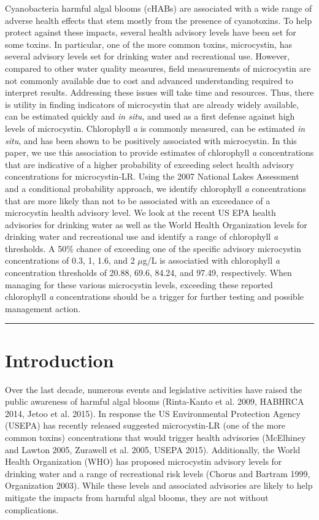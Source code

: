 \documentclass[11pt,]{article}
\begin{document}
Cyanobacteria harmful algal blooms (cHABs) are associated with a wide
range of adverse health effects that stem mostly from the presence of
cyanotoxins. To help protect against these impacts, several health
advisory levels have been set for some toxins. In particular, one of the
more common toxins, microcystin, has several advisory levels set for
drinking water and recreational use. However, compared to other water
quality measures, field measurements of microcystin are not commonly
available due to cost and advanced understanding required to interpret
results. Addressing these issues will take time and resources. Thus,
there is utility in finding indicators of microcystin that are already
widely available, can be estimated quickly and \emph{in situ}, and used
as a first defense against high levels of microcystin. Chlorophyll
\emph{a} is commonly measured, can be estimated \emph{in situ}, and has
been shown to be positively associated with microcystin. In this paper,
we use this association to provide estimates of chlorophyll \emph{a}
concentrations that are indicative of a higher probability of exceeding
select health advisory concentrations for microcystin-LR. Using the 2007
National Lakes Assessment and a conditional probability approach, we
identify chlorophyll \emph{a} concentrations that are more likely than
not to be associated with an exceedance of a microcystin health advisory
level. We look at the recent US EPA health advisories for drinking water
as well as the World Health Organization levels for drinking water and
recreational use and identify a range of chlorophyll \emph{a}
thresholds. A 50\% chance of exceeding one of the specific advisory
microcystin concentrations of 0.3, 1, 1.6, and 2 \(\mu\)g/L is
associatied with chlorophyll \emph{a} concentration thresholds of 20.88,
69.6, 84.24, and 97.49, respectively. When managing for these various
microcystin levels, exceeding these reported chlorophyll \emph{a}
concentrations should be a trigger for further testing and possible
management action.

\vspace{3mm}

\hrule

\doublespace

\section{Introduction}\label{introduction}

Over the last decade, numerous events and legislative activities have
raised the public awareness of harmful algal blooms (Rinta-Kanto et al.
2009, HABHRCA 2014, Jetoo et al. 2015). In response the US Environmental
Protection Agency (USEPA) has recently released suggested microcystin-LR
(one of the more common toxins) concentrations that would trigger health
advisories (McElhiney and Lawton 2005, Zurawell et al. 2005, USEPA
2015). Additionally, the World Health Organization (WHO) has proposed
microcystin advisory levels for drinking water and a range of
recreational risk levels (Chorus and Bartram 1999, Organization 2003).
While these levels and associated advisories are likely to help mitigate
the impacts from harmful algal blooms, they are not without
complications.
\end{document}
